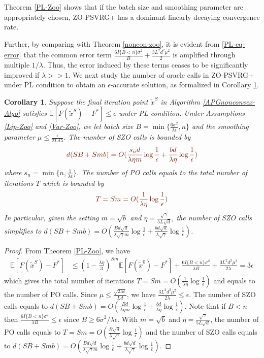 \documentclass{article}
\newcommand*{\E}{\mathbb{E}}
\newtheorem{corollary}[theorem]{Corollary}
\theoremstyle{definition}
\theoremstyle{remark}
\begin{document}
{\color{Brown}
Theorem \ref{PL-Zoo} shows that if the batch size and smoothing parameter are  appropriately chosen, ZO-PSVRG+ has a dominant linearly decaying convergence rate. 

}
Further, by comparing with Theorem \ref{noncon-zoo}, it is evident from \eqref{PL-eq-error} that the
 common error term $\frac{6I\{B < n\} \sigma ^2}{B}+\frac{3L^2 d^2 \mu^2}{2}$ is amplified through multiple $1/\lambda$. Thus, the error induced by these terms ceases to be significantly improved if $\lambda >> 1$. We next study the number of oracle calls in ZO-PSVRG+ under PL condition to obtain an $\epsilon$-accurate solution, as formalized in Corollary \ref{PL-Zo-Cor}. 

\begin{corollary}\label{PL-Zo-Cor}
Suppose the final iteration point $\tilde{x}^S$ in Algorithm \ref{APGnonconvex-Algo} satisfies $\E[F(\tilde{x}^S) - F^*]\leq \epsilon$ under PL condition. Under Assumptions \ref{Lip-Zoo} and \ref{Var-Zoo}, we let batch size $B = \min\{\frac{6\sigma^2}{\lambda\epsilon},n\}$ and the smoothing parameter $\mu\leq \frac{\epsilon}{2Ld\lambda}$. The number of SZO calls is bounded by
\[
{\color{Brown}d(SB+Smb) = O(\frac{s_n d}{\lambda\eta m}\log\frac{1}{\epsilon}+\frac{b d}{\lambda\eta}\log\frac{1}{\epsilon})}
\]
where $s_n = \min \{n,\frac{1}{\lambda \epsilon}\}$.
The number of PO calls equals to the total number of iterations $T$ which is bounded by
\[
{\color{Brown} T = Sm = O(\frac{1}{\lambda\eta}\log\frac{1}{\epsilon})}
\]
In particular, given the setting  $m=\sqrt{b}$ and {\color{blue}$\eta = \frac{\sqrt{\gamma}}{5 L \sqrt{d}}$}, the number of SZO calls  simplifies to 
{\color{blue}$d(SB+Smb) = O(\frac{Bd\sqrt{d}}{\lambda\sqrt{\gamma} m}\log\frac{1}{\epsilon}+\frac{bd\sqrt{d}}{\lambda\sqrt{\gamma}}\log\frac{1}{\epsilon})$.}
\end{corollary}
\begin{proof}
From Theorem \ref{PL-Zoo}, we have
\begin{align}
\E[F(\tilde{x}^S) - {F}^*] & \leq   \left(1-\frac{\lambda\eta}{3}\right)^{Sm} \E[F(\tilde{x}^0) - {F}^*] + \frac{6I\{B < n\} \sigma ^2}{\lambda B}+\frac{3 L^2 d^2 \mu^2}{2\lambda}= 3 \epsilon
\end{align}
which gives the total number of iterations {\color{Brown} $T = Sm = O(\frac{1}{\lambda\eta}\log\frac{1}{\epsilon})$} and equals to the number of PO calls. Since $\mu \leq \frac{\sqrt{2\lambda\epsilon}}{L d}$, we have $\frac{3 L^2 d^2 \mu^2}{2\lambda} \leq \epsilon$. The number of SZO calls equals to {\color{Brown}$d(SB+Smb) = O(\frac{Bd}{\lambda\eta m}\log\frac{1}{\epsilon}+\frac{bd}{\lambda\eta}\log\frac{1}{\epsilon})$}.  Note that if $B < n$ then $\frac{6I\{B < n\} \sigma ^2}{\lambda B} \leq \epsilon$ since $B \geq 6 {\sigma ^2}/{\lambda \epsilon}$. With $m=\sqrt{b}$ and $\eta = \frac{\sqrt{\gamma}}{5 L \sqrt{d}}$, the number of PO calls equals to {\color{Blue} $T = Sm = O(\frac{B\sqrt{d}}{\lambda\sqrt{\gamma}}\log\frac{1}{\epsilon})$} and the number of SZO calls equals to {\color{blue}$d(SB+Smb) = O(\frac{Bd\sqrt{d}}{\lambda\sqrt{\gamma} m}\log\frac{1}{\epsilon}+\frac{bd\sqrt{d}}{\lambda\sqrt{\gamma}}\log\frac{1}{\epsilon})$}.
\end{proof}
\end{document}
